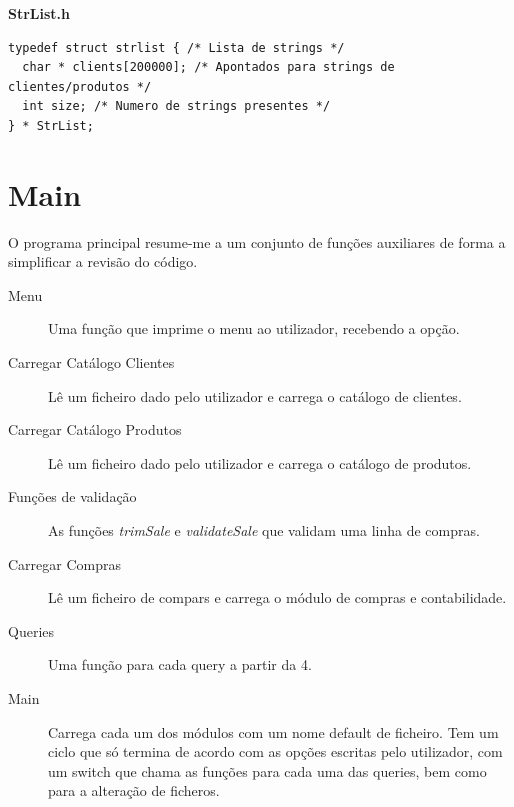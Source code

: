 \documentclass[10pt] {article}
\begin{document}
\textbf{StrList.h}
\begin{lstlisting}
typedef struct strlist { /* Lista de strings */
  char * clients[200000]; /* Apontados para strings de clientes/produtos */
  int size; /* Numero de strings presentes */
} * StrList;
\end{lstlisting}

\newpage
\section{Main}
\par O programa principal resume-me a um conjunto de funções auxiliares de forma a simplificar a revisão do código.

\begin{description}
  \item[Menu] Uma função que imprime o menu ao utilizador, recebendo a opção.

  \item[Carregar Catálogo Clientes] Lê um ficheiro dado pelo utilizador e carrega o catálogo de clientes.

  \item[Carregar Catálogo Produtos] Lê um ficheiro dado pelo utilizador e carrega o catálogo de produtos.

  \item[Funções de validação] As funções \emph{trimSale} e \emph{validateSale} que validam uma linha de compras.

  \item[Carregar Compras] Lê um ficheiro de compars e carrega o módulo de compras e contabilidade.

  \item[Queries] Uma função para cada query a partir da 4.

  \item[Main] Carrega cada um dos módulos com um nome default de ficheiro. Tem um ciclo que só termina de acordo com as opções escritas pelo utilizador, com um switch que chama as funções para cada uma das queries, bem como para a alteração de ficheros.

\end{description}

\newpage
\end{document}
